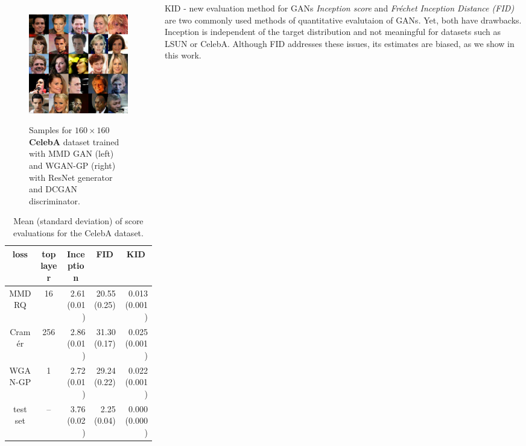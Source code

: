 \documentclass[xcolor={table}]{beamer}
\begin{document}
\begin{frame}{}
\begin{columns}[T, totalwidth=\textwidth]
\begin{column}{.32\textwidth}
\begin{figure}
      ~
      \includegraphics[width=.32\columnwidth]{samples/celeba-cramer-25.png}
      \caption{Samples for \textbf{$160 \times 160$ CelebA} dataset trained with 
               MMD GAN (left) and WGAN-GP (right) with ResNet generator and DCGAN discriminator.}
    \end{figure}
    \begin{table}
      \centering
      \caption{Mean (standard deviation) of score evaluations for the CelebA dataset.}
      \label{tab:celeba-scores}
      \begin{tabular}{cc|rrr}
        loss & top layer & \multicolumn{1}{c}{Inception} & \multicolumn{1}{c}{FID} & \multicolumn{1}{c}{KID} \\
        \hline
        MMD RQ   &   16 &    2.61  (0.01) &   20.55  (0.25) &   0.013  (0.001)\\
        Cram\'er &  256 &    2.86  (0.01) &   31.30  (0.17) &   0.025  (0.001)\\
        WGAN-GP  & 1    &    2.72  (0.01) &   29.24  (0.22) &   0.022  (0.001)\\
        test set & --   &    3.76  (0.02) &    2.25  (0.04) &   0.000  (0.000)\\
    \end{tabular}
\end{table}
  \end{column}

  \begin{column}{.32\textwidth}
    \begin{block}{KID - new evaluation method for GANs}
      \emph{Inception score} and \emph{Fr\'echet Inception Distance (FID)} are two commonly used methods 
      of quantitative evalutaion of GANs. Yet, both have drawbacks. Inception is 
      independent of the target distribution and not meaningful for datasets such as LSUN or CelebA.
      Although FID addresses these issues, its estimates are biased, as we show in this work.


\end{block}
\end{column}
\end{columns}
\end{frame}
\end{document}
